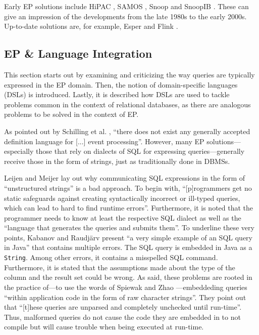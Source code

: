 \documentclass[article, 10pt, type=bsc, colorback, accentcolor=tud8b, parskip=half, bibliography=totocnumbered]{tudthesis}
\begin{document}
Early EP solutions include HiPAC \cite{Dayal:1988:HPC:44203.44208}, SAMOS \cite{Gatziu:1996:SAO:901611}, Snoop \cite{Chakravarthy:1994:CEA:645920.672994} and SnoopIB \cite{Adaikkalavan:2006:SIE:1176530.1176536}.
These can give an impression of the developments from the late 1980s to the early 2000s.
Up-to-date solutions are, for example, Esper \cite{esper} and Flink \cite{flink}.

\subsection{EP \& Language Integration}
\label{sec:ep_language_integration}

This section starts out by examining and criticizing the way queries are typically expressed in the EP domain.
Then, the notion of domain-specific languages (DSLs) is introduced.
Lastly, it is described how DSLs are used to tackle problems common in the context of relational databases, as there are analogous problems to be solved in the context of EP.

As pointed out by Schilling et al. \cite{Schilling:2010:DHE:1827418.1827453}, ``there does not exist any generally accepted definition language for [...] event processing''.
However, many EP solutions---especially those that rely on dialects of SQL for expressing queries---generally receive those in the form of strings, just as traditionally done in DBMSs.

Leijen and Meijer \cite{Leijen:1999:DSE:331960.331977} lay out why communicating SQL expressions in the form of ``unstructured strings'' is a bad approach.
To begin with, ``[p]rogrammers get no static safeguards against creating syntactically incorrect or ill-typed queries, which can lead to hard to find runtime errors''.
Furthermore, it is noted that the programmer needs to know at least the respective SQL dialect as well as the ``language that generates the queries and submits them''.
To underline these very points, Kabanov and Raudjärv \cite{Kabanov:2008:ETD:1411732.1411758} present ``a very simple example of an SQL query in Java'' that contains multiple errors.
The SQL query is embedded in Java as a \lstinline{String}.
Among other errors, it contains a misspelled SQL command.
Furthermore, it is stated that the assumptions made about the type of the column and the result set could be wrong.
As said, these problems are rooted in the practice of---to use the words of Spiewak and Zhao \cite{Spiewak:2009:SLD:2127907.2127923}---embeddeding queries ``within application code in the form of raw character strings''.
They point out that ``[t]hese queries are unparsed and completely unchecked until run-time''.
Thus, malformed queries do not cause the code they are embedded in to not compile but will cause trouble when being executed at run-time.
\end{document}
